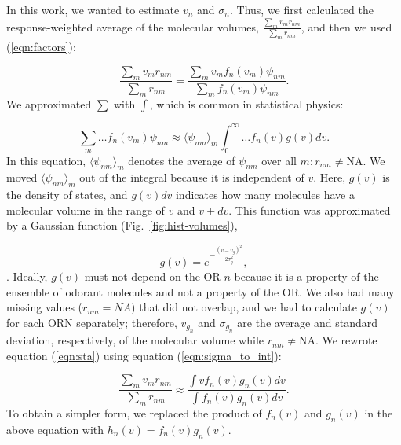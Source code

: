\documentclass[fleqn,11pt]{wlscirep}
\begin{document}
In this work, we wanted to estimate $v_n$ and $\sigma_n$. 
Thus, we first calculated the response-weighted average of the molecular volumes, 
$\frac{\sum_{m} v_m r_{nm}}{\sum_{m} r_{nm}}$, and then we used (\ref{eqn:factors}):

\begin{equation}
	\frac{\displaystyle \sum_{m} v_m r_{nm}}{\displaystyle \sum_{m} r_{nm}} = \frac{\displaystyle \sum_{m} v_m f_n(v_m) \psi_{nm}}{\displaystyle \sum_{m} f_n(v_m) \psi_{nm}}.
	\label{eqn:sta}
\end{equation}
We approximated $\sum$ with $\int$, which is common in statistical physics:

\begin{equation}
	\sum_{m} \dots f_n(v_m) \psi_{nm} \approx  \langle \psi_{nm} \rangle_m \int_0^\infty \dots f_n(v) g(v)  dv. 
	\label{eqn:sigma_to_int}
\end{equation}
In this equation, 
$\langle \psi_{nm} \rangle_m$ denotes the average of $\psi_{nm}$ over all $m: r_{nm} \neq \text{NA}$. 
We moved $\langle \psi_{nm} \rangle_m$ out of the integral because it is independent of $v$.
Here, $g(v)$ is the density of states, and $g(v) dv$ indicates how many molecules have a molecular volume in the range of $v$ and $v+dv$.
This function was approximated by a Gaussian function (Fig.~\ref{fig:hist-volumes}), 

\begin{equation}
	g(v) = e^{-\frac{(v- v_{g})^2}{2 \sigma_{g}^2}},
	\label{eqn:hist-volumes}
\end{equation}.
Ideally, $g(v)$ must not depend on the OR $n$ because it is a property of the ensemble of odorant molecules and not a property of the OR. 
We also had many missing values ($r_{nm} = NA$) that did not overlap, and
 we had to calculate $g(v)$ for each ORN separately; 
therefore, $v_{g_n}$ and $\sigma_{g_n}$ are the average and standard deviation, respectively, of the molecular volume while $r_{nm} \neq \text{NA}$.
We rewrote equation (\ref{eqn:sta}) using equation (\ref{eqn:sigma_to_int}):

\begin{equation}
	\frac{\displaystyle \sum_{m} v_m r_{nm}}{\displaystyle \sum_{m} r_{nm}} \approx \frac{\displaystyle \int v f_n(v) g_n(v) dv}{\displaystyle \int f_n(v) g_n(v) dv}.
	\label{eqn:sta_int}
\end{equation}
To obtain a simpler form, we replaced the product of $f_n(v)$ and $g_n(v)$ in the above equation with $h_n(v) = f_n(v) g_n(v)$.
\end{document}

